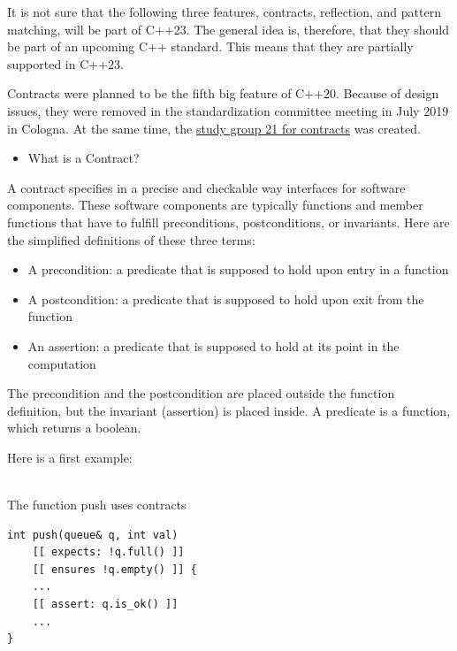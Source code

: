 
It is not sure that the following three features, contracts, reflection, and pattern matching, will be part of C++23. The general idea is, therefore, that they should be part of an upcoming C++ standard. This means that they are partially supported in C++23.


Contracts were planned to be the fifth big feature of C++20. Because of design issues, they were removed in the standardization committee meeting in July 2019 in Cologna. At the same time, the \href{https://isocpp.org/std/the-committee}{study group 21 for contracts} was created.

\begin{itemize}
\item 
What is a Contract?
\end{itemize}

A contract specifies in a precise and checkable way interfaces for software components. These software components are typically functions and member functions that have to fulfill preconditions, postconditions, or invariants. Here are the simplified definitions of these three terms:

\begin{itemize}
\item 
A precondition: a predicate that is supposed to hold upon entry in a function

\item 
A postcondition: a predicate that is supposed to hold upon exit from the function

\item 
An assertion: a predicate that is supposed to hold at its point in the computation
\end{itemize}

The precondition and the postcondition are placed outside the function definition, but the invariant (assertion) is placed inside. A predicate is a function, which returns a boolean.

Here is a first example:

\hspace*{\fill} \\ %
\noindent
The function push uses contracts
\begin{lstlisting}[style=styleCXX]
int push(queue& q, int val)
	[[ expects: !q.full() ]]
	[[ ensures !q.empty() ]] {
	...
	[[ assert: q.is_ok() ]]
	...
}
\end{lstlisting}

